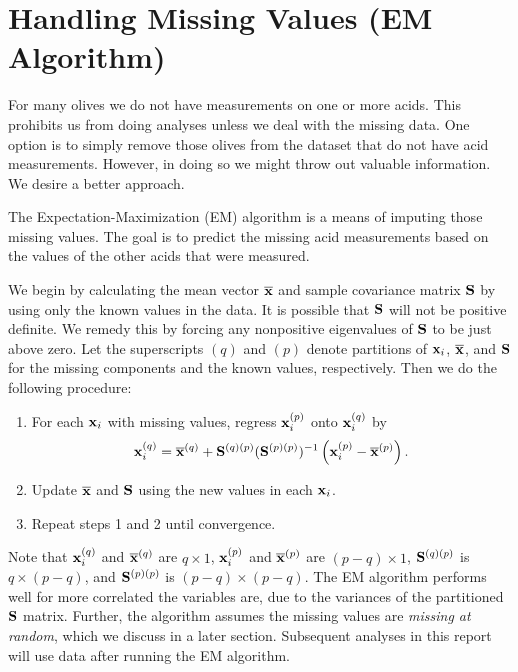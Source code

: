 \section{Handling Missing Values (EM Algorithm)}

For many olives we do not have measurements on one or more acids. This prohibits us from doing analyses unless we deal with the missing data. One option is to simply remove those olives from the dataset that do not have acid measurements. However, in doing so we might throw out valuable information. We desire a better approach.

The Expectation-Maximization (EM) algorithm is a means of imputing those missing values. The goal is to predict the missing acid measurements based on the values of the other acids that were measured.

We begin by calculating the mean vector $\overline{\mathbf{\bm{x}}}$ and sample covariance matrix $\mathbf{\bm{S}}$ by using only the known values in the data. It is possible that $\mathbf{\bm{S}}$ will not be positive definite. We remedy this by forcing any nonpositive eigenvalues of $\mathbf{\bm{S}}$ to be just above zero. Let the superscripts $(q)$ and $(p)$ denote partitions of $\mathbf{\bm{x}}_i$, $\overline{\mathbf{\bm{x}}}$, and $\mathbf{\bm{S}}$ for the missing components and the known values, respectively. Then we do the following procedure:

\begin{enumerate}
\item For each $\mathbf{\bm{x}}_i$ with missing values, regress $\mathbf{\bm{x}}_i^{(p)}$ onto $\mathbf{\bm{x}}_i^{(q)}$ by
\begin{eqnarray*}
\mathbf{\bm{x}}_i^{(q)} = \overline{\mathbf{\bm{x}}}^{(q)} + \mathbf{\bm{S}}^{(q)(p)}(\mathbf{\bm{S}}^{(p)(p)})^{-1}\left(\mathbf{\bm{x}}_i^{(p)}-\overline{\mathbf{\bm{x}}}^{(p)}\right). 
\end{eqnarray*}
\item Update $\overline{\mathbf{\bm{x}}}$ and $\mathbf{\bm{S}}$ using the new values in each $\mathbf{\bm{x}}_i$.
\item Repeat steps 1 and 2 until convergence.
\end{enumerate}

\noindent Note that $\mathbf{\bm{x}}_i^{(q)}$ and $\overline{\mathbf{\bm{x}}}^{(q)}$ are $q\times1$, $\mathbf{\bm{x}}_i^{(p)}$ and $\overline{\mathbf{\bm{x}}}^{(p)}$ are $(p-q)\times1$, $\mathbf{\bm{S}}^{(q)(p)}$ is $q\times(p-q)$, and $\mathbf{\bm{S}}^{(p)(p)}$ is $(p-q)\times(p-q)$. The EM algorithm performs well for more correlated the variables are, due to the variances of the partitioned $\mathbf{\bm{S}}$ matrix. Further, the algorithm assumes the missing values are \emph{missing at random}, which we discuss in a later section. Subsequent analyses in this report will use data after running the EM algorithm.
